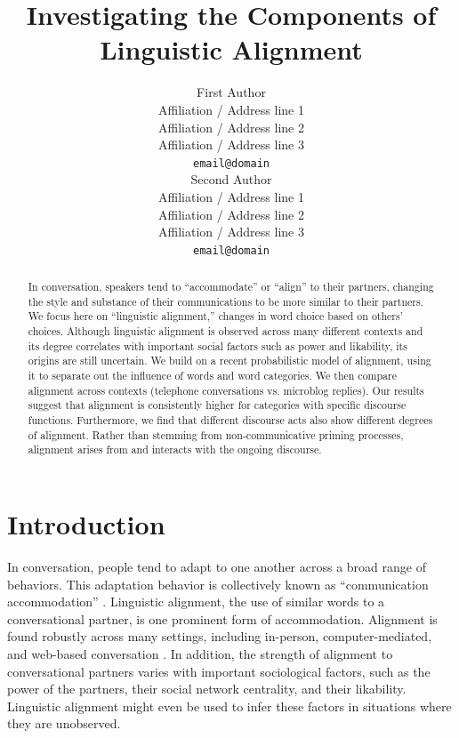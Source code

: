 \documentclass[11pt]{article}
\title{Investigating the Components of Linguistic Alignment}
\author{First Author \\
  Affiliation / Address line 1 \\
  Affiliation / Address line 2 \\
  Affiliation / Address line 3 \\
  {\tt email@domain} \\\And
  Second Author \\
  Affiliation / Address line 1 \\
  Affiliation / Address line 2 \\
  Affiliation / Address line 3 \\
  {\tt email@domain} \\}
\date{}
\begin{document}
\maketitle
\begin{abstract}
In conversation, speakers tend to ``accommodate'' or ``align'' to their partners, changing the style and substance of their communications to be more similar to their partners. We focus here on ``linguistic alignment,'' changes in word choice based on others' choices. Although linguistic alignment is observed across many different contexts and its degree correlates with important social factors such as power and likability, its origins are still uncertain.
We build on a recent probabilistic model of alignment, using it to separate out the influence of words and word categories. We then compare alignment across contexts (telephone conversations vs. microblog replies). Our results suggest that alignment is consistently higher for categories with specific discourse functions. Furthermore, we find that different discourse acts also show different degrees of alignment. Rather than stemming from non-communicative priming processes, alignment arises from and interacts with the ongoing discourse.
\end{abstract}


\section{Introduction}

In conversation, people tend to adapt to one another across a broad range of behaviors. This adaptation behavior is collectively known as ``communication accommodation'' \cite{GilesCouplandCoupland1991}. Linguistic alignment, the use of similar words to a conversational partner, is one prominent form of accommodation. Alignment is found robustly across many settings, including in-person, computer-mediated, and web-based conversation \cite{DNMEtAl2012,GilesSchererTaylor1979,NiederhofferPennebaker2002}. In addition, the strength of alignment to conversational partners varies with important sociological factors, such as the power of the partners, their social network centrality, and their likability. Linguistic alignment might even be used to infer these factors in situations where they are unobserved.
\end{document}
